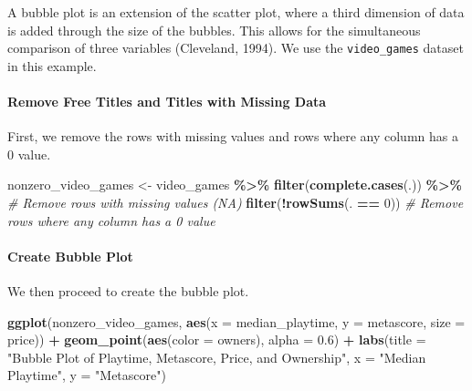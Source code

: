 \documentclass[
]{book}
\newenvironment{Shaded}{\begin{snugshade}}{\end{snugshade}}
\newcommand{\AttributeTok}[1]{\textcolor[rgb]{0.13,0.29,0.53}{#1}}
\newcommand{\CommentTok}[1]{\textcolor[rgb]{0.56,0.35,0.01}{\textit{#1}}}
\newcommand{\DecValTok}[1]{\textcolor[rgb]{0.00,0.00,0.81}{#1}}
\newcommand{\FloatTok}[1]{\textcolor[rgb]{0.00,0.00,0.81}{#1}}
\newcommand{\FunctionTok}[1]{\textcolor[rgb]{0.13,0.29,0.53}{\textbf{#1}}}
\newcommand{\NormalTok}[1]{#1}
\newcommand{\OtherTok}[1]{\textcolor[rgb]{0.56,0.35,0.01}{#1}}
\newcommand{\SpecialCharTok}[1]{\textcolor[rgb]{0.81,0.36,0.00}{\textbf{#1}}}
\newcommand{\StringTok}[1]{\textcolor[rgb]{0.31,0.60,0.02}{#1}}
\begin{document}
A bubble plot is an extension of the scatter plot, where a third dimension of data is added through the size of the bubbles. This allows for the simultaneous comparison of three variables (Cleveland, 1994). We use the \texttt{video\_games} dataset in this example.

\paragraph{Remove Free Titles and Titles with Missing Data}\label{remove-free-titles-and-titles-with-missing-data}

First, we remove the rows with missing values and rows where any column has a 0 value.

\begin{Shaded}
\begin{Highlighting}[]
\NormalTok{nonzero\_video\_games }\OtherTok{\textless{}{-}}\NormalTok{ video\_games }\SpecialCharTok{\%\textgreater{}\%}
  \FunctionTok{filter}\NormalTok{(}\FunctionTok{complete.cases}\NormalTok{(.)) }\SpecialCharTok{\%\textgreater{}\%}  \CommentTok{\# Remove rows with missing values (NA)}
  \FunctionTok{filter}\NormalTok{(}\SpecialCharTok{!}\FunctionTok{rowSums}\NormalTok{(. }\SpecialCharTok{==} \DecValTok{0}\NormalTok{))  }\CommentTok{\# Remove rows where any column has a 0 value}
\end{Highlighting}
\end{Shaded}

\paragraph*{Create Bubble Plot}\label{create-bubble-plot}

We then proceed to create the bubble plot.

\begin{Shaded}
\begin{Highlighting}[]
\FunctionTok{ggplot}\NormalTok{(nonzero\_video\_games, }\FunctionTok{aes}\NormalTok{(}\AttributeTok{x =}\NormalTok{ median\_playtime, }\AttributeTok{y =}\NormalTok{ metascore, }\AttributeTok{size =}\NormalTok{ price)) }\SpecialCharTok{+}
  \FunctionTok{geom\_point}\NormalTok{(}\FunctionTok{aes}\NormalTok{(}\AttributeTok{color =}\NormalTok{ owners), }\AttributeTok{alpha =} \FloatTok{0.6}\NormalTok{) }\SpecialCharTok{+}
  \FunctionTok{labs}\NormalTok{(}\AttributeTok{title =} \StringTok{"Bubble Plot of Playtime, Metascore, Price, and Ownership"}\NormalTok{,}
       \AttributeTok{x =} \StringTok{"Median Playtime"}\NormalTok{,}
       \AttributeTok{y =} \StringTok{"Metascore"}\NormalTok{)}
\end{Highlighting}
\end{Shaded}
\end{document}
